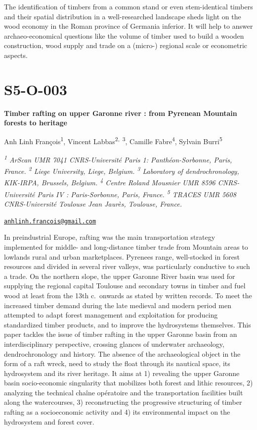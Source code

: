 \documentclass[
]{book}
\begin{document}
The identification of timbers from a common stand or even stem-identical timbers and their spatial distribution in a well-researched landscape sheds light on the wood economy in the Roman province of Germania inferior. It will help to answer archaeo-economical questions like the volume of timber used to build a wooden construction, wood supply and trade on a (micro-) regional scale or econometric aspects.

\hypertarget{s5-o-003}{%
\section*{S5-O-003}\label{s5-o-003}}

\textbf{Timber rafting on upper Garonne river : from Pyrenean Mountain forests to heritage}

Anh Linh François\textsuperscript{1}, Vincent Labbas\textsuperscript{2,~3}, Camille Fabre\textsuperscript{4}, Sylvain Burri\textsuperscript{5}

\emph{\textsuperscript{1} ArScan UMR 7041 CNRS-Université Paris 1: Panthéon-Sorbonne, Paris, France. \textsuperscript{2} Liege University, Liege, Belgium. \textsuperscript{3} Laboratory of dendrochronology, KIK-IRPA, Brussels, Belgium. \textsuperscript{4} Centre Roland Mousnier UMR 8596 CNRS-Université Paris IV : Paris-Sorbonne, Paris, France. \textsuperscript{5} TRACES UMR 5608 CNRS-Université Toulouse Jean Jaurès, Toulouse, France.}

\href{mailto:anhlinh.francois@gmail.com}{\nolinkurl{anhlinh.francois@gmail.com}}

In preindustrial Europe, rafting was the main transportation strategy implemented for middle- and long-distance timber trade from Mountain areas to lowlands rural and urban marketplaces. Pyrenees range, well-stocked in forest resources and divided in several river valleys, was particularly conductive to such a trade. On the northern slope, the upper Garonne River basin was used for supplying the regional capital Toulouse and secondary towns in timber and fuel wood at least from the 13th c.~onwards as stated by written records. To meet the increased timber demand during the late medieval and modern period men attempted to adapt forest management and exploitation for producing standardized timber products, and to improve the hydrosystems themselves. This paper tackles the issue of timber rafting in the upper Garonne basin from an interdisciplinary perspective, crossing glances of underwater archaeology, dendrochronology and history. The absence of the archaeological object in the form of a raft wreck, need to study the float through its nautical space, its hydrosystem and its river heritage. It aims at 1) revealing the upper Garonne basin socio-economic singularity that mobilizes both forest and lithic resources, 2) analyzing the technical chaîne opératoire and the transportation facilities built along the watercourses, 3) reconstructing the progressive structuring of timber rafting as a socioeconomic activity and 4) its environmental impact on the hydrosystem and forest cover.
\end{document}
